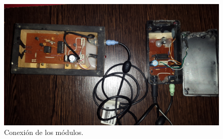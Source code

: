 \clearpage


\begin{figure}[H]
	\centering
	\includegraphics[width=0.9\paperwidth, angle=90]{img/REAL/complete.jpg}
	\caption{\footnotesize{Conexión de los módulos.}}
	\label{fig:IR_complete_real}
\end{figure}
